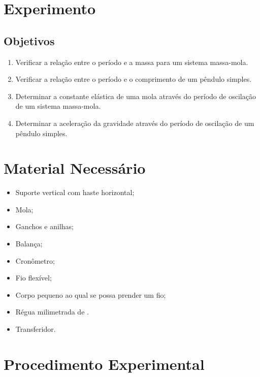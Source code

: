 \section{Experimento}

\subsection{Objetivos}
\label{Sec:ObjetivosOscilacoes}

\begin{enumerate}
	\item Verificar a relação entre o período e a massa para um sistema massa-mola.
	\item Verificar a relação entre o período e o comprimento de um pêndulo simples.
	\item Determinar a constante elástica de uma mola através do período de oscilação de um sistema massa-mola.
	\item Determinar a aceleração da gravidade através do período de oscilação de um pêndulo simples.
\end{enumerate}

\section{Material Necessário}
\begin{itemize}
	\item Suporte vertical com haste horizontal;
	\item Mola;
	\item Ganchos e anilhas;
	\item Balança;
	\item Cronômetro;
	\item Fio flexível;
	\item Corpo pequeno ao qual se possa prender um fio;
	\item Régua milimetrada de .
	\item Transferidor.
\end{itemize}

\section{Procedimento Experimental}

